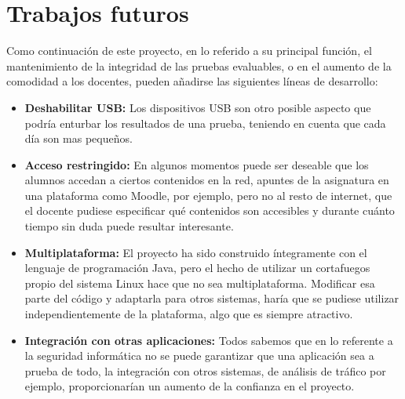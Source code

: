 \section{Trabajos futuros}
\label{sec:futuro:futuro}

Como continuación de este proyecto, en lo referido a su principal función, el mantenimiento de la integridad de las pruebas evaluables, o en el aumento de la comodidad a los docentes, pueden añadirse las siguientes líneas de desarrollo:

\begin{itemize}

    \item {\bfseries Deshabilitar USB:} Los dispositivos USB son otro posible aspecto que podría enturbar los resultados de una prueba, teniendo en cuenta que cada día son mas pequeños.
        
    \item {\bfseries Acceso restringido:} En algunos momentos puede ser deseable que los alumnos accedan a ciertos contenidos en la red, apuntes de la asignatura en una plataforma como Moodle, por ejemplo, pero no al resto de internet, que el docente pudiese especificar qué contenidos son accesibles y durante cuánto tiempo sin duda puede resultar interesante.
    
    \item {\bfseries Multiplataforma:} El proyecto ha sido construido íntegramente con el lenguaje de programación Java, pero el hecho de utilizar un cortafuegos propio del sistema Linux hace que no sea multiplataforma. Modificar esa parte del código y adaptarla para otros sistemas, haría que se pudiese utilizar independientemente de la plataforma, algo que es siempre atractivo.
        
    \item {\bfseries Integración con otras aplicaciones:} Todos sabemos que en lo referente a la seguridad informática no se puede garantizar que una aplicación sea a prueba de todo, la integración con otros sistemas, de análisis de tráfico por ejemplo, proporcionarían un aumento de la confianza en el proyecto.
    
\end{itemize}